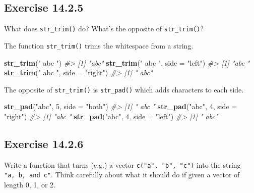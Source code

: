 \documentclass[]{book}
\newenvironment{Shaded}{\begin{snugshade}}{\end{snugshade}}
\newcommand{\CommentTok}[1]{\textcolor[rgb]{0.56,0.35,0.01}{\textit{#1}}}
\newcommand{\DataTypeTok}[1]{\textcolor[rgb]{0.13,0.29,0.53}{#1}}
\newcommand{\DecValTok}[1]{\textcolor[rgb]{0.00,0.00,0.81}{#1}}
\newcommand{\KeywordTok}[1]{\textcolor[rgb]{0.13,0.29,0.53}{\textbf{#1}}}
\newcommand{\NormalTok}[1]{#1}
\newcommand{\StringTok}[1]{\textcolor[rgb]{0.31,0.60,0.02}{#1}}
\theoremstyle{plain}
\theoremstyle{remark}
\begin{document}
\hypertarget{exercise-14.2.5}{%
\subsection*{\texorpdfstring{Exercise
{14.2.5}}{Exercise 14.2.5}}\label{exercise-14.2.5}}

What does \texttt{str\_trim()} do? What's the opposite of
\texttt{str\_trim()}?

The function \texttt{str\_trim()} trims the whitespace from a string.

\begin{Shaded}
\begin{Highlighting}[]
\KeywordTok{str_trim}\NormalTok{(}\StringTok{" abc "}\NormalTok{)}
\CommentTok{#> [1] "abc"}
\KeywordTok{str_trim}\NormalTok{(}\StringTok{" abc "}\NormalTok{, }\DataTypeTok{side =} \StringTok{"left"}\NormalTok{)}
\CommentTok{#> [1] "abc "}
\KeywordTok{str_trim}\NormalTok{(}\StringTok{" abc "}\NormalTok{, }\DataTypeTok{side =} \StringTok{"right"}\NormalTok{)}
\CommentTok{#> [1] " abc"}
\end{Highlighting}
\end{Shaded}

The opposite of \texttt{str\_trim()} is \texttt{str\_pad()} which adds
characters to each side.

\begin{Shaded}
\begin{Highlighting}[]
\KeywordTok{str_pad}\NormalTok{(}\StringTok{"abc"}\NormalTok{, }\DecValTok{5}\NormalTok{, }\DataTypeTok{side =} \StringTok{"both"}\NormalTok{)}
\CommentTok{#> [1] " abc "}
\KeywordTok{str_pad}\NormalTok{(}\StringTok{"abc"}\NormalTok{, }\DecValTok{4}\NormalTok{, }\DataTypeTok{side =} \StringTok{"right"}\NormalTok{)}
\CommentTok{#> [1] "abc "}
\KeywordTok{str_pad}\NormalTok{(}\StringTok{"abc"}\NormalTok{, }\DecValTok{4}\NormalTok{, }\DataTypeTok{side =} \StringTok{"left"}\NormalTok{)}
\CommentTok{#> [1] " abc"}
\end{Highlighting}
\end{Shaded}

\hypertarget{exercise-14.2.6}{%
\subsection*{\texorpdfstring{Exercise
{14.2.6}}{Exercise 14.2.6}}\label{exercise-14.2.6}}

Write a function that turns (e.g.) a vector \texttt{c("a",\ "b",\ "c")}
into the string \texttt{"a,\ b,\ and\ c"}. Think carefully about what it
should do if given a vector of length 0, 1, or 2.
\end{document}
